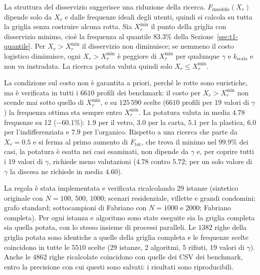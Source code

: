 La struttura del disservizio suggerisce una riduzione della ricerca. $F_{\mathrm{insoddis}}(X_r)$ dipende solo da $X_r$ e dalle frequenze ideali degli utenti, quindi si calcola su tutta la griglia senza costruire alcuna rotta. Sia $X^{\min}_r$ il punto della griglia con disservizio minimo, cioè la frequenza al quantile $83.3\%$ della Sezione~\ref{sse:t1-quantile}. Per $X_r>X^{\min}_r$ il disservizio non diminuisce; se nemmeno il costo logistico diminuisce, ogni $X_r>X^{\min}_r$ è peggiore di $X^{\min}_r$ per qualunque $\gamma$ e $k_{\mathrm{scala}}$ e non va instradata. La ricerca potata valuta quindi solo $X_r\le X^{\min}_r$.

La condizione sul costo non è garantita a priori, perché le rotte sono euristiche, ma è verificata in tutti i $6610$ profili dei benchmark: il costo per $X_r>X^{\min}_r$ non scende mai sotto quello di $X^{\min}_r$, e su $125\,590$ scelte ($6610$ profili per 19 valori di $\gamma$) la frequenza ottima sta sempre entro $X^{\min}_r$. La potatura valuta in media $4.78$ frequenze su 12 ($-60.1\%$): $1.9$ per il vetro, $3.0$ per la carta, $5.1$ per la plastica, $6.0$ per l'indifferenziata e $7.9$ per l'organico. Rispetto a una ricerca che parte da $X_r=0.5$ e si ferma al primo aumento di $F_{\mathrm{tot}}$, che trova il minimo nel $99.9\%$ dei casi, la potatura è esatta nei casi esaminati, non dipende da $\gamma$ e, per coprire tutti i 19 valori di $\gamma$, richiede meno valutazioni ($4.78$ contro $5.72$; per un solo valore di $\gamma$ la discesa ne richiede in media $4.60$).

La regola è stata implementata e verificata ricalcolando 29 istanze (sintetico originale con $N=100$, $500$, $1000$; scenari residenziale, villette e grandi condomini; grafo standard; sottocampioni di Fabriano con $N=1000$ e $2000$; Fabriano completa). Per ogni istanza e algoritmo sono state eseguite sia la griglia completa sia quella potata, con lo stesso insieme di processi paralleli. Le $1382$ righe della griglia potata sono identiche a quelle della griglia completa e le frequenze scelte coincidono in tutte le $5510$ scelte (29 istanze, 2 algoritmi, 5 rifiuti, 19 valori di $\gamma$). Anche le $4862$ righe ricalcolate coincidono con quelle dei CSV dei benchmark, entro la precisione con cui questi sono salvati: i risultati sono riproducibili.

